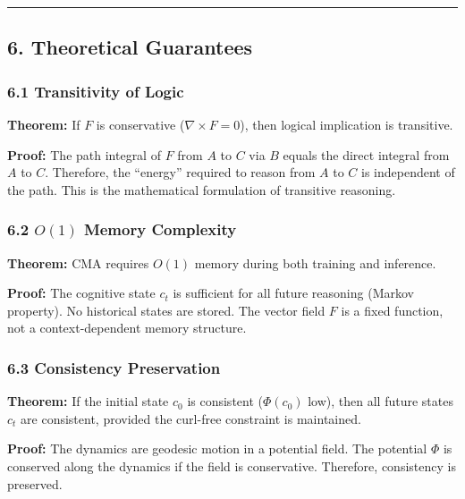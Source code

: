 \documentclass[
  11pt,
  a4paper,
]{article}
\begin{document}
\begin{center}\rule{0.5\linewidth}{0.5pt}\end{center}

\subsection{6. Theoretical Guarantees}\label{theoretical-guarantees}

\subsubsection{6.1 Transitivity of Logic}\label{transitivity-of-logic}

\textbf{Theorem:} If \(F\) is conservative (\(\nabla \times F = 0\)),
then logical implication is transitive.

\textbf{Proof:} The path integral of \(F\) from \(A\) to \(C\) via \(B\)
equals the direct integral from \(A\) to \(C\). Therefore, the
``energy'' required to reason from \(A\) to \(C\) is independent of the
path. This is the mathematical formulation of transitive reasoning.

\subsubsection{\texorpdfstring{6.2 \(O(1)\) Memory
Complexity}{6.2 O(1) Memory Complexity}}\label{o1-memory-complexity}

\textbf{Theorem:} CMA requires \(O(1)\) memory during both training and
inference.

\textbf{Proof:} The cognitive state \(c_t\) is sufficient for all future
reasoning (Markov property). No historical states are stored. The vector
field \(F\) is a fixed function, not a context-dependent memory
structure.

\subsubsection{6.3 Consistency
Preservation}\label{consistency-preservation}

\textbf{Theorem:} If the initial state \(c_0\) is consistent
(\(\Phi(c_0)\) low), then all future states \(c_t\) are consistent,
provided the curl-free constraint is maintained.

\textbf{Proof:} The dynamics are geodesic motion in a potential field.
The potential \(\Phi\) is conserved along the dynamics if the field is
conservative. Therefore, consistency is preserved.
\end{document}
